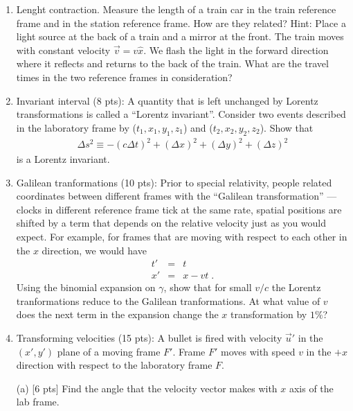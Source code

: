 \begin{enumerate}

\item Lenght contraction. Measure the length of a train car in the train reference frame and
 in the station reference frame. How are they related?
 Hint: Place a light source at the back of a train and a mirror at the front.
 The train  moves with constant velocity $\vec v= v\hat{x}$. We flash the light in the forward direction where
  it reflects and returns to the back of the train. What are the travel times in the two reference
   frames in consideration?

\item Invariant interval (8 pts): A quantity that is left unchanged by
Lorentz transformations is called a ``Lorentz invariant''.  Consider
two events described in the laboratory frame by ($t_1, x_1, y_1, z_1$)
and ($t_2, x_2, y_2, z_2$).  Show that
\begin{eqnarray*}
\Delta s^2 \equiv -(c\Delta t)^2 + (\Delta x)^2 + (\Delta y)^2 +
(\Delta z)^2
\end{eqnarray*}
is a Lorentz invariant.

\item Galilean tranformations (10 pts): Prior to special relativity,
people related coordinates between different frames with the
``Galilean transformation'' --- clocks in different reference frame
tick at the same rate, spatial positions are shifted by a term that
depends on the relative velocity just as you would expect.  For
example, for frames that are moving with respect to each other in the
$x$ direction, we would have
\begin{eqnarray*}
t' &=& t
\\
x' &=& x - v t\;.
\end{eqnarray*}
Using the binomial expansion on $\gamma$, show that for small $v/c$
the Lorentz tranformations reduce to the Galilean tranformations.  At
what value of $v$ does the next term in the expansion change the $x$
transformation by $1\%$?

\item Transforming velocities (15 pts): A bullet is fired with
velocity $\vec u'$ in the $(x',y')$ plane of a moving frame $F'$.
Frame $F'$ moves with speed $v$ in the $+x$ direction with respect to
the laboratory frame $F$.

\par\noindent (a) [6 pts] Find the angle that the velocity vector makes
with $x$ axis of the lab frame.


\end{enumerate}
